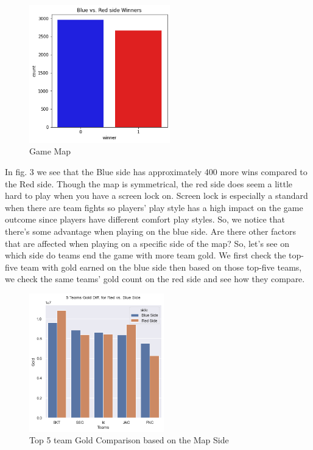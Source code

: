 \documentclass[conference]{IEEEtran}
\begin{document}
\begin{figure}[!ht]
  \begin{center}
 \includegraphics[height=6cm]{graphics/BvR_w.png}
 \caption{Game Map}
 \label{Waveform of each emotion}
 \end{center}
\end{figure}

In fig. 3 we see that the Blue side has approximately 400 more wins compared to the Red side. Though the map is symmetrical, the red side does seem a little hard to play when you have a screen lock on. Screen lock is especially a standard when there are team fights so players' play style has a high impact on the game outcome since players have different comfort play styles. So, we notice that there's some advantage when playing on the blue side. Are there other factors that are affected when playing on a specific side of the map? So, let's see on which side do teams end the game with more team gold. We first check the top-five team with gold earned on the blue side then based on those top-five teams, we check the same teams' gold count on the red side and see how they compare.

\begin{figure}[!ht]
  \begin{center}
 \includegraphics[height=6cm]{graphics/gold_diff_RvB.png}
 \caption{Top 5 team Gold Comparison based on the Map Side}
 \label{Top 5 team Gold Comparison based on the Map Side}
 \end{center}
\end{figure}
\end{document}
